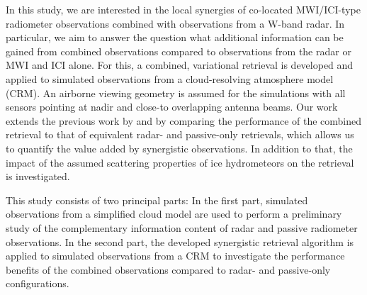 \documentclass[journal abbreviation, manuscript]{copernicus}
\begin{document}
In this study, we are interested in the local synergies of co-located
MWI/ICI-type radiometer observations combined with observations from a W-band
radar. In particular, we aim to answer the question what additional information
can be gained from combined observations compared to observations from the radar
or MWI and ICI alone. For this, a combined, variational retrieval is developed
and applied to simulated observations from a cloud-resolving atmosphere model
(CRM). An airborne viewing geometry is assumed for the simulations with all
sensors pointing at nadir and close-to overlapping antenna beams. Our work
extends the previous work by \citet{evans05} and \citet{jiang19} by comparing
the performance of the combined retrieval to that of equivalent radar- and
passive-only retrievals, which allows us to quantify the value added by
synergistic observations. In addition to that, the impact of the assumed
scattering properties of ice hydrometeors on the retrieval is investigated.

%
This study consists of two principal parts: In the first part, simulated
observations from a simplified cloud model are used to perform a preliminary
study of the complementary information content of radar and passive radiometer
observations. In the second part, the developed synergistic retrieval algorithm
is applied to simulated observations from a CRM to investigate the performance
benefits of the combined observations compared to radar- and passive-only
configurations.
\end{document}
